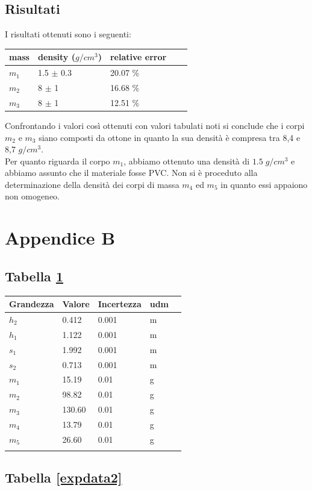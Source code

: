 \documentclass[11pt,a4paper]{article}
\begin{document}
\subsection{Risultati}

I risultati ottenuti sono i seguenti:

\begin{longtable}[]{@{}lllll@{}}
\toprule
mass & density ($g/cm^3$) & relative error \tabularnewline
\midrule
\endhead
$m_1$ & 1.5 $\pm$ 0.3 & 20.07 \% \tabularnewline
$m_2$ & 8 $\pm$ 1 & 16.68 \% \tabularnewline
$m_3$ & 8 $\pm$ 1 & 12.51 \% \tabularnewline
\bottomrule
\end{longtable}

Confrontando i valori così ottenuti con valori tabulati noti si conclude che i corpi $m_2$ e $m_3$ siano composti da ottone in quanto la sua densità è compresa tra 8,4 e 8,7 $g/cm^3$. \\
Per quanto riguarda il corpo $m_1$, abbiamo ottenuto una densità di $1.5 \; g/cm^3$ e abbiamo assunto che il materiale fosse PVC.
Non si è proceduto alla determinazione della densità dei corpi di massa $m_4$ ed $m_5$ in quanto essi appaiono non omogeneo.



\section{Appendice B}
\subsection{Tabella \ref{expdata1}}

\begin{longtable}[]{@{}lllll@{}}
\toprule
Grandezza & Valore & Incertezza & udm \tabularnewline
\midrule
\endhead
$h_2$ & 0.412 & 0.001 & m \tabularnewline
$h_1$ & 1.122 & 0.001 & m \tabularnewline
$s_1$ & 1.992 & 0.001 & m \tabularnewline
$s_2$ & 0.713 & 0.001 & m \tabularnewline
$m_1$ & 15.19 & 0.01 & g \tabularnewline
$m_2$ & 98.82 & 0.01 & g \tabularnewline
$m_3$ & 130.60 & 0.01 & g \tabularnewline
$m_4$ & 13.79 & 0.01 & g \tabularnewline
$m_5$ & 26.60 & 0.01 & g \tabularnewline
\bottomrule
\label{expdata1}
\end{longtable}


\subsection{Tabella \ref{expdata2}}
\end{document}
